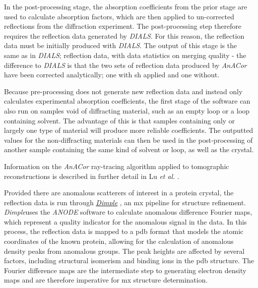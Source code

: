 
In the post-processing stage, the absorption coefficients from the prior stage are used to calculate absorption factors, which are then applied to un-corrected reflections from the diffraction experiment. The post-processing step therefore requires the reflection data generated by  \textit{DIALS}. For this reason, the reflection data must be initially produced with  \textit{DIALS}. The output of this stage is the same as in  \textit{DIALS}; reflection data, with data statistics on merging quality - the difference to  \textit{DIALS} is that the two sets of reflection data produced by \textit{AnACor} have been corrected analytically; one with \ac{sh} applied and one without.

Because pre-processing does not generate new reflection data and instead only calculates experimental absorption coefficients, the first stage of the software can also run on samples void of diffracting material, such as an empty loop or a loop containing solvent. The advantage of this is that samples containing only or largely one type of material will produce more reliable coefficients. The outputted values for the non-diffracting materials can then be used in the post-processing of another sample containing the same kind of solvent or loop, as well as the crystal.

Information on the \textit{AnACor} ray-tracing algorithm applied to tomographic reconstructions is described in further detail in Lu \textit{et al.} \cite{Lu2024}.

Provided there are anomalous scatterers of interest in a protein crystal, the reflection data is run through \href{http://ccp4.github.io/dimple}{\textit{Dimple}} \cite{Thorn2011}, an \ac{mx} pipeline for structure refinement. \textit{Dimple}uses the \textit{ANODE} software to calculate anomalous difference Fourier maps, which represent a quality indicator for the anomalous signal in the data. In this process, the reflection data is mapped to a \ac{pdb} format that models the atomic coordinates of the known protein, allowing for the calculation of anomalous density peaks from anomalous groups. The peak heights are affected by several factors, including structural isomerism and binding ions in the \ac{pdb} structure. The Fourier difference maps are the intermediate step to generating electron density maps and are therefore imperative for \ac{mx} structure determination. %

